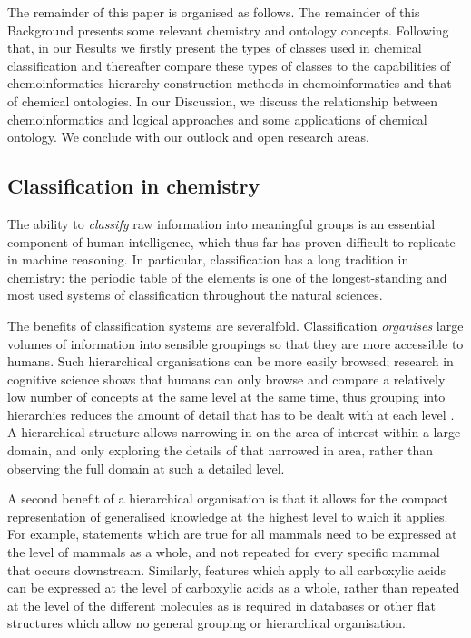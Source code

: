 \documentclass[10pt]{bmc_article}
\newenvironment{bmcformat}{\baselineskip20pt\sloppy\setboolean{publ}{false}}{\baselineskip20pt\sloppy}
\begin{document}
\begin{bmcformat}
The remainder of this paper is organised as follows. The remainder of this Background presents some relevant chemistry and ontology concepts.  Following that, in our Results we firstly present the types of classes used in chemical classification and thereafter compare these types of classes to the capabilities of chemoinformatics hierarchy construction methods in chemoinformatics and that of chemical ontologies. In our Discussion, we discuss the relationship between chemoinformatics and logical approaches and some applications of chemical ontology.  We conclude with our outlook and open research areas. 



\subsection*{Classification in chemistry}
\label{sec:backclassif}

The ability to \textit{classify} raw information into meaningful groups is an essential component of human intelligence, which thus far has proven difficult to replicate in machine reasoning.  In particular, classification has a long tradition in chemistry:  the periodic table of the elements is one of the longest-standing and most used systems of classification throughout the natural sciences.  

The benefits of classification systems are severalfold. Classification \textit{organises} large volumes of information into sensible groupings so that they are more accessible to humans. Such hierarchical organisations can be more easily browsed; research in cognitive science shows that humans can only browse and compare a relatively low number of concepts at the same level at the same time, thus grouping into hierarchies reduces the amount of detail that has to be dealt with at each level \cite{sternberg2003}. A hierarchical structure allows narrowing in on the area of interest within a large domain, and only exploring the details of that narrowed in area, rather than observing the full domain at such a detailed level. 

A second benefit of a hierarchical organisation is that it allows for the compact representation of generalised knowledge at the highest level to which it applies.  For example, statements which are true for all mammals need to be expressed at the level of mammals as a whole, and not repeated for every specific mammal that occurs downstream.  Similarly, features which apply to all carboxylic acids can be expressed at the level of carboxylic acids as a whole, rather than repeated at the level of the different molecules as is required in databases or other flat structures which allow no general grouping or hierarchical organisation. 


\end{bmcformat}
\end{document}
